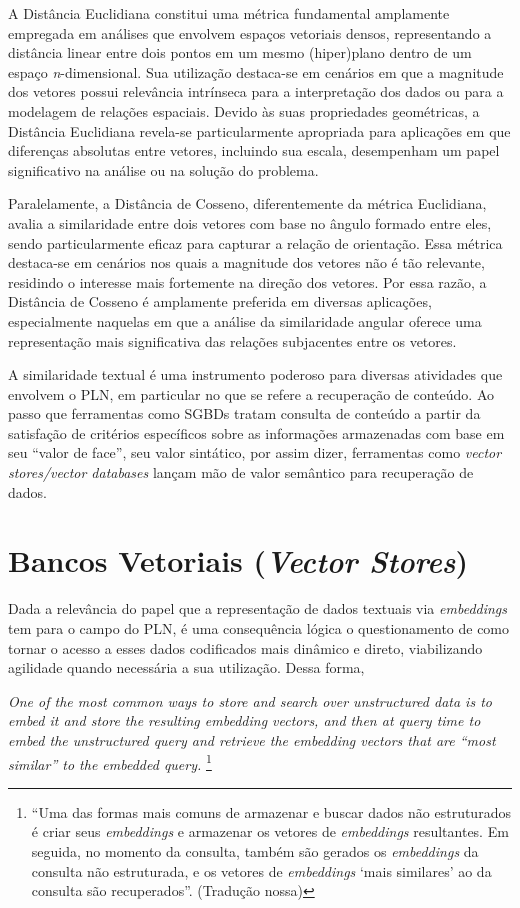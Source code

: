 A Distância Euclidiana constitui uma métrica fundamental amplamente empregada em análises que envolvem espaços vetoriais densos, representando a distância linear entre dois pontos em um mesmo (hiper)plano dentro de um espaço \textit{n}-dimensional. Sua utilização destaca-se em cenários em que a magnitude dos vetores possui relevância intrínseca para a interpretação dos dados ou para a modelagem de relações espaciais. Devido às suas propriedades geométricas, a Distância Euclidiana revela-se particularmente apropriada para aplicações em que diferenças absolutas entre vetores, incluindo sua escala, desempenham um papel significativo na análise ou na solução do problema.

Paralelamente, a Distância de Cosseno, diferentemente da métrica Euclidiana, avalia a similaridade entre dois vetores com base no ângulo formado entre eles, sendo particularmente eficaz para capturar a relação de orientação. Essa métrica destaca-se em cenários nos quais a magnitude dos vetores não é tão relevante, residindo o interesse mais fortemente na direção dos vetores. Por essa razão, a Distância de Cosseno é amplamente preferida em diversas aplicações, especialmente naquelas em que a análise da similaridade angular oferece uma representação mais significativa das relações subjacentes entre os vetores.

A similaridade textual é uma instrumento poderoso para diversas atividades que envolvem o \ac{PLN}, em particular no que se refere a recuperação de conteúdo. Ao passo que ferramentas como \ac{SGBD}s tratam consulta de conteúdo a partir da satisfação de critérios específicos sobre as informações armazenadas com base em seu ``valor de face'', seu valor sintático, por assim dizer, ferramentas como \textit{vector stores/vector databases} lançam mão de valor semântico para recuperação de dados.

\section{Bancos Vetoriais (\textit{Vector Stores})}
\label{sec:Teorico.4}
Dada a relevância do papel que a representação de dados textuais via \textit{embeddings} tem para o campo do \ac{PLN}, é uma consequência lógica o questionamento de como tornar o acesso a esses dados codificados mais dinâmico e direto, viabilizando agilidade quando necessária a sua utilização. Dessa forma,
\begin{citacao}
    \textit{One of the most common ways to store and search over unstructured data is to embed it and store the resulting embedding vectors, and then at query time to embed the unstructured query and retrieve the embedding vectors that are ``most similar'' to the embedded query.} \cite{Bancos-Vetoriais:1} \footnote{``Uma das formas mais comuns de armazenar e buscar dados não estruturados é criar seus \textit{embeddings} e armazenar os vetores de \textit{embeddings} resultantes. Em seguida, no momento da consulta, também são gerados os \textit{embeddings} da consulta não estruturada, e os vetores de \textit{embeddings} `mais similares' ao da consulta são recuperados''. (Tradução nossa)}
\end{citacao}

